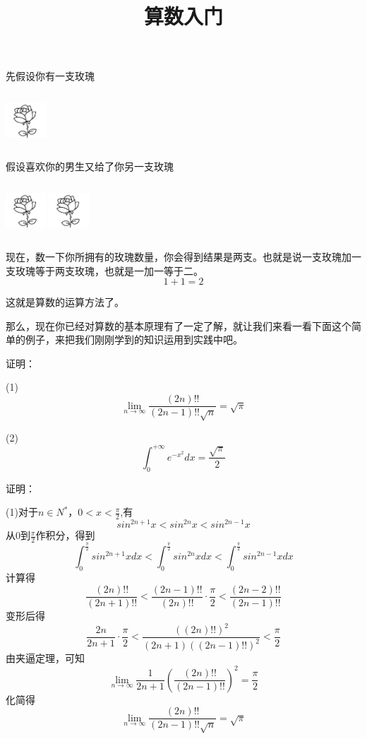\documentclass{ctexart}
\title{算数入门}
\date{}
\begin{document}
\maketitle

先假设你有一支玫瑰

\includegraphics[width=1.5cm,height=2cm]{1.jpg}



假设喜欢你的男生又给了你另一支玫瑰

\includegraphics[width=1.5cm,height=2cm]{1.jpg}
\includegraphics[width=1.5cm,height=2cm]{1.jpg}


现在，数一下你所拥有的玫瑰数量，你会得到结果是两支。也就是说一支玫瑰加一支玫瑰等于两支玫瑰，也就是一加一等于二。$$1+1=2$$

这就是算数的运算方法了。


那么，现在你已经对算数的基本原理有了一定了解，就让我们来看一看下面这个简单的例子，来把我们刚刚学到的知识运用到实践中吧。




\noindent
{}


证明：


(1)$$\lim\limits_{n \to \infty }\frac{(2n)!!}{(2n-1)!!\sqrt{n}}=\sqrt{\pi}$$


(2)$$\int_{0}^{+\infty}e^{-x^{2}} dx=\frac{\sqrt{\pi}}{2}$$


证明：

(1)对于$n\in N^{*}$，$0<x<\frac{\pi}{2}$,有
$$sin^{2n+1}x<sin^{2n}x<sin^{2n-1}x$$
从0到$\frac{\pi}{2}$作积分，得到$$\int_{0}^{\frac{\pi}{2}}sin^{2n+1}xdx<\int_{0}^{\frac{\pi}{2}}sin^{2n}xdx<\int_{0}^{\frac{\pi}{2}}sin^{2n-1}xdx$$
计算得$$\frac{(2n)!!}{(2n+1)!!}<\frac{(2n-1)!!}{(2n)!!}\cdot\frac{\pi}{2}<\frac{(2n-2)!!}{(2n-1)!!}$$
变形后得$$\frac{2n}{2n+1}\cdot\frac{\pi}{2}<\frac{((2n)!!)^{2}}{(2n+1)((2n-1)!!)^{2}}<\frac{\pi}{2}$$
由夹逼定理，可知$$\lim\limits_{n \to \infty }\frac{1}{2n+1}(\frac{(2n)!!}{(2n-1)!!})^{2}=\frac{\pi}{2}$$
化简得$$\lim\limits_{n \to \infty }\frac{(2n)!!}{(2n-1)!!\sqrt{n}}=\sqrt{\pi}$$
\end{document}
